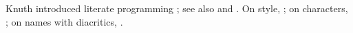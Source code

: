 \documentclass{article}
\begin{document}
Knuth introduced literate programming \parencite{knuth1984}; see also \textcite{lamport1994}
and \textcite{kew2005}. On style, \cite{bringhurst2004}; on characters, \cite{unicode16};
on names with diacritics, \cite{muller2020}.
\printbibliography
\end{document}
